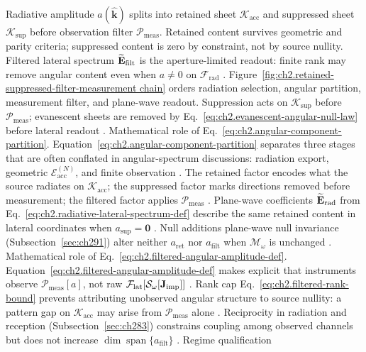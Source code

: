 Radiative amplitude $a(\widehat{\mathbf{k}})$ splits into retained sheet $\mathcal{K}_{\mathrm{acc}}$ and suppressed sheet $\mathcal{K}_{\mathrm{sup}}$ before observation filter $\mathcal{P}_{\mathrm{meas}}$. Retained content survives geometric and parity criteria; suppressed content is zero by constraint, not by source nullity. Filtered lateral spectrum $\widetilde{\mathbf{E}}_{\mathrm{filt}}$ is the aperture-limited readout: finite rank may remove angular content even when $a\neq 0$ on $\mathcal{F}_{\mathrm{rad}}$ \cite{stratton1941}. Figure~\ref{fig:ch2.retained-suppressed-filter-measurement chain} orders radiation selection, angular
partition, measurement filter, and plane-wave readout. Suppression acts on
\(\mathcal{K}_{\mathrm{sup}}\) before \(\mathcal{P}_{\mathrm{meas}}\); evanescent sheets are
removed by Eq.~\eqref{eq:ch2.evanescent-angular-null-law} before lateral readout
\cite{stratton1941}.
Mathematical role of Eq.~\eqref{eq:ch2.angular-component-partition}. Equation~\eqref{eq:ch2.angular-component-partition} separates three stages that are often
conflated in angular-spectrum discussions: radiation export, geometric $\mathcal{E}_{\mathrm{acc}}^{(N)}$, and finite
observation \cite{stratton1941}. The retained factor encodes what the source radiates
on \(\mathcal{K}_{\mathrm{acc}}\); the suppressed factor marks directions removed before
measurement; the filtered factor applies \(\mathcal{P}_{\mathrm{meas}}\) \cite{stratton1941}.
Plane-wave coefficients \(\widetilde{\mathbf{E}}_{\mathrm{rad}}\) from
Eq.~\eqref{eq:ch2.radiative-lateral-spectrum-def} describe the same retained content in lateral
coordinates when \(a_{\mathrm{sup}}=\mathbf{0}\) \cite{jackson1999}. Null additions
plane-wave null invariance (Subsection~\ref{sec:ch291}) alter neither \(a_{\mathrm{ret}}\) nor
\(a_{\mathrm{filt}}\) when \(\mathcal{M}_\omega\) is unchanged \cite{stratton1941}.
Mathematical role of Eq.~\eqref{eq:ch2.filtered-angular-amplitude-def}. Equation~\eqref{eq:ch2.filtered-angular-amplitude-def} makes explicit that instruments observe
\(\mathcal{P}_{\mathrm{meas}}[a]\), not raw \(\mathcal{F}_{\mathrm{lat}}[\mathcal{S}_\omega[\mathbf{J}_{\mathrm{imp}}]]\)
\cite{stratton1941}. Rank cap Eq.~\eqref{eq:ch2.filtered-rank-bound} prevents
attributing unobserved angular structure to source nullity: a pattern gap on
\(\mathcal{K}_{\mathrm{acc}}\) may arise from \(\mathcal{P}_{\mathrm{meas}}\) alone
\cite{harrington2001}. Reciprocity in radiation and reception (Subsection~\ref{sec:ch283}) constrains
coupling among observed channels but does not increase
\(\dim\operatorname{span}\{a_{\mathrm{filt}}\}\) \cite{stratton1941}. Regime qualification
